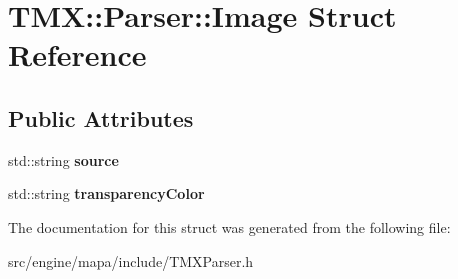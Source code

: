 \hypertarget{struct_t_m_x_1_1_parser_1_1_image}{}\section{T\+MX\+:\+:Parser\+:\+:Image Struct Reference}
\label{struct_t_m_x_1_1_parser_1_1_image}
\subsection*{Public Attributes}
\begin{DoxyCompactItemize}
\item 
std\+::string {\bfseries source}\hypertarget{struct_t_m_x_1_1_parser_1_1_image_acfd86626cd8c040f3a2bfdbdb6d79d20}{}\label{struct_t_m_x_1_1_parser_1_1_image_acfd86626cd8c040f3a2bfdbdb6d79d20}

\item 
std\+::string {\bfseries transparency\+Color}\hypertarget{struct_t_m_x_1_1_parser_1_1_image_a4f7c0ba4c3c7a7525b85370b576a32eb}{}\label{struct_t_m_x_1_1_parser_1_1_image_a4f7c0ba4c3c7a7525b85370b576a32eb}

\end{DoxyCompactItemize}


The documentation for this struct was generated from the following file\+:\begin{DoxyCompactItemize}
\item 
src/engine/mapa/include/T\+M\+X\+Parser.\+h\end{DoxyCompactItemize}
